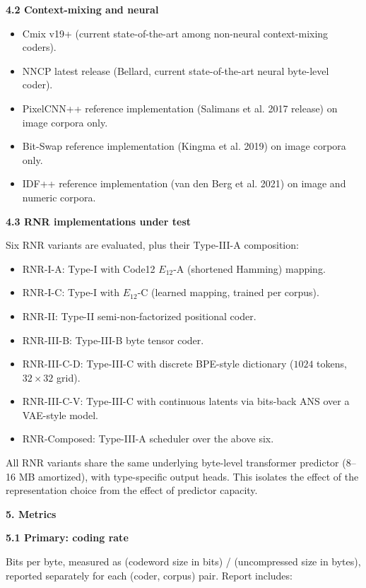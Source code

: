 \documentclass[
]{article}
\begin{document}
\textbf{4.2 Context-mixing and neural}

\begin{itemize}
\item
  Cmix v19+ (current state-of-the-art among non-neural context-mixing
  coders).
\item
  NNCP latest release (Bellard, current state-of-the-art neural
  byte-level coder).
\item
  PixelCNN++ reference implementation (Salimans et al. 2017 release) on
  image corpora only.
\item
  Bit-Swap reference implementation (Kingma et al. 2019) on image
  corpora only.
\item
  IDF++ reference implementation (van den Berg et al. 2021) on image and
  numeric corpora.
\end{itemize}

\textbf{4.3 RNR implementations under test}

Six RNR variants are evaluated, plus their Type-III-A composition:

\begin{itemize}
\item
  RNR-I-A: Type-I with Code12 $E_{12}$-A (shortened Hamming) mapping.
\item
  RNR-I-C: Type-I with $E_{12}$-C (learned mapping, trained per corpus).
\item
  RNR-II: Type-II semi-non-factorized positional coder.
\item
  RNR-III-B: Type-III-B byte tensor coder.
\item
  RNR-III-C-D: Type-III-C with discrete BPE-style dictionary
  ($1024$ tokens, $32 \times 32$ grid).
\item
  RNR-III-C-V: Type-III-C with continuous latents via bits-back ANS over
  a VAE-style model.
\item
  RNR-Composed: Type-III-A scheduler over the above six.
\end{itemize}

All RNR variants share the same underlying byte-level transformer
predictor (8--16 MB amortized), with type-specific output heads. This
isolates the effect of the representation choice from the effect of
predictor capacity.

\textbf{5. Metrics}

\textbf{5.1 Primary: coding rate}

Bits per byte, measured as (codeword size in bits) / (uncompressed size
in bytes), reported separately for each (coder, corpus) pair. Report
includes:
\end{document}
